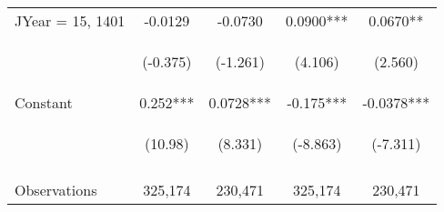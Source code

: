 \documentclass[]{standalone}
\begin{document}
\begin{tabular}{lcccc}
    JYear = 15, 1401 & -0.0129                                        & -0.0730                                        & 0.0900***                                      & 0.0670**                                       \\
    \vspace{4pt}     & \begin{footnotesize}(-0.375)\end{footnotesize} & \begin{footnotesize}(-1.261)\end{footnotesize} & \begin{footnotesize}(4.106)\end{footnotesize}  & \begin{footnotesize}(2.560)\end{footnotesize}  \\
    Constant         & 0.252***                                       & 0.0728***                                      & -0.175***                                      & -0.0378***                                     \\
                     & \begin{footnotesize}(10.98)\end{footnotesize}  & \begin{footnotesize}(8.331)\end{footnotesize}  & \begin{footnotesize}(-8.863)\end{footnotesize} & \begin{footnotesize}(-7.311)\end{footnotesize} \\
    \vspace{4pt}     & \begin{footnotesize}\end{footnotesize}         & \begin{footnotesize}\end{footnotesize}         & \begin{footnotesize}\end{footnotesize}         & \begin{footnotesize}\end{footnotesize}         \\
    Observations     & 325,174                                        & 230,471                                        & 325,174                                        & 230,471                                        \\

\end{tabular}
\end{document}
